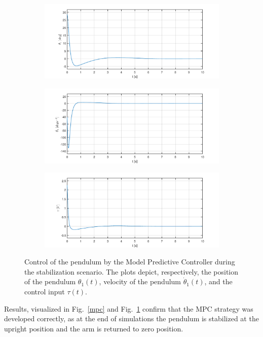 \begin{figure}[H]
	\centering
	\begin{subfigure}
		\centering
		\includegraphics[scale=0.6]{images/MPC/pend.pdf}  
	\end{subfigure}
	\begin{subfigure}
		\centering
		\includegraphics[scale=0.6]{images/MPC/dpend.pdf}  
	\end{subfigure}
	\begin{subfigure}
		\centering
		\includegraphics[scale=0.6]{images/MPC/control.pdf}  
	\end{subfigure}
	\caption{Control of the pendulum by the Model Predictive Controller during the stabilization scenario. The plots depict, respectively, the position of the pendulum $\theta_1(t)$, velocity of the pendulum $\dot{\theta}_1(t)$, and the control input $\tau(t)$.}
	\label{mpc1}
\end{figure}
Results, visualized in Fig.~\ref{mpc} and Fig.~\ref{mpc1} confirm that the MPC strategy was developed correctly, as at the end of simulations the pendulum is stabilized at the upright position and the arm is returned to zero position.

